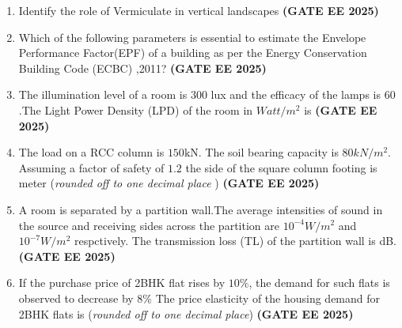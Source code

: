 \documentclass[journal,12pt,onecolumn]{IEEEtran}
\theoremstyle{remark}
\begin{document}
\begin{enumerate}
\begin{figure}[H]
    \caption{}
    \label{fig1}
\end{figure}
\item Identify the role of Vermiculate in vertical landscapes \hfill \textbf{(GATE EE 2025)}
\begin{enumerate}
\end{enumerate}
\item Which of the following parameters is essential to estimate the Envelope Performance Factor(EPF) of a building as per the Energy Conservation Building Code (ECBC) ,2011? \hfill \textbf{(GATE EE 2025)}
\begin{enumerate}
\end{enumerate}
\item The illumination level of a room is $300$ lux and the efficacy of the lamps is $60$.The Light Power Density (LPD) of the room in $Watt/m^2$ is \underline{\makebox[2cm]{\hfill}} \hfill \textbf{(GATE EE 2025)}\\
\item The load on a RCC column is $150\text{kN}$. The soil bearing capacity is $80 kN/m^2$. Assuming a factor of safety of $1.2$ the side of the square column footing is  \underline{\makebox[2cm]{\hfill}} meter (\textit{rounded off to one decimal place} ) \hfill \textbf{(GATE EE 2025)}\\
\item A room is separated by a partition wall.The average intensities of sound in the source and receiving sides across the partition are $10^{-4} W/m^2$ and $10^{-7} W/m^2$ respctively. The transmission loss (TL) of the partition wall is \underline{\makebox[2cm]{\hfill}} dB. \hfill \textbf{(GATE EE 2025)}\\
\item If the purchase price of 2BHK flat rises by $10\%$, the demand for such flats is observed to decrease by $8\%$ The price elasticity of the housing demand for 2BHK flats is \underline{\makebox[2cm]{\hfill}}(\textit{rounded off to one decimal place}) \hfill \textbf{(GATE EE 2025)}\\

\end{enumerate}
\end{document}
